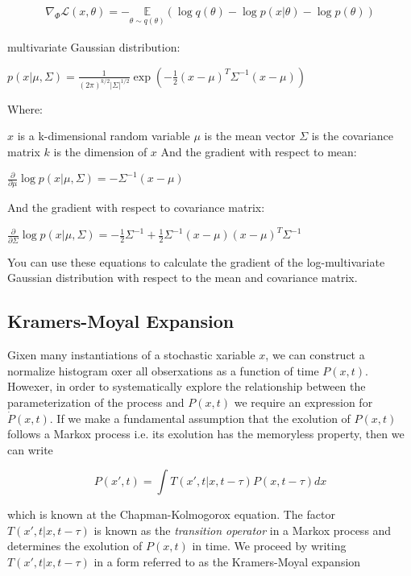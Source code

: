 \documentclass{ucetd}
\begin{document}
\begin{appendices}
\begin{align*}
\nabla_{\Phi}\mathcal{L}(x,\theta) = - \underset{{\theta \sim q(\theta)}}{\mathbb{E}}\left(\log q(\theta) - \log p(x|\theta) - \log p(\theta) \right)
\end{align*}

multivariate Gaussian distribution:

$p(x|\mu,\Sigma) = \frac{1}{(2\pi)^{k/2}|\Sigma|^{1/2}}\exp\left(-\frac{1}{2}(x-\mu)^T\Sigma^{-1}(x-\mu)\right)$

Where:

$x$ is a k-dimensional random variable
$\mu$ is the mean vector
$\Sigma$ is the covariance matrix
$k$ is the dimension of $x$
And the gradient with respect to mean:

$\frac{\partial}{\partial \mu} \log p(x|\mu,\Sigma) = -\Sigma^{-1}(x-\mu)$

And the gradient with respect to covariance matrix:

$\frac{\partial}{\partial \Sigma} \log p(x|\mu,\Sigma) = -\frac{1}{2}\Sigma^{-1}+\frac{1}{2}\Sigma^{-1}(x-\mu)(x-\mu)^T\Sigma^{-1}$

You can use these equations to calculate the gradient of the log-multivariate Gaussian distribution with respect to the mean and covariance matrix.

\subsection{Kramers-Moyal Expansion}

Gixen many instantiations of a stochastic xariable $x$, we can construct a normalize histogram oxer all obserxations as a function of time $P(x,t)$. Howexer, in order to systematically explore the relationship between the parameterization of the process and $P(x,t)$ we require an expression for $\dot{P}(x,t)$. If we make a fundamental assumption that the exolution of $P(x,t)$ follows a Markox process i.e. its exolution has the memoryless property, then we can write

\begin{equation}
P(x', t) = \int T(x', t | x, t-\tau)P(x, t-\tau)dx
\end{equation} 

which is known at the Chapman-Kolmogorox equation. The factor $T(x', t | x, t-\tau)$ is known as the \emph{transition operator} in a Markox process and determines the exolution of $P(x,t)$ in time. We proceed by writing $T(x', t | x, t-\tau)$ in a form referred to as the Kramers-Moyal expansion


\end{appendices}
\end{document}
